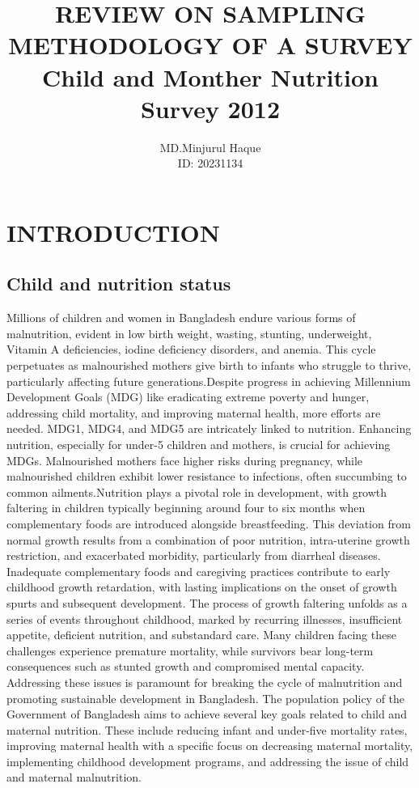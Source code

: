 \documentclass{report}
\title{REVIEW ON SAMPLING METHODOLOGY OF A SURVEY\\Child and Monther Nutrition Survey 2012}
\author{MD.Minjurul Haque \\ID: 20231134}
\date{}
\begin{document}
\maketitle
\pagebreak



\chapter{\huge{INTRODUCTION}}
\section{Child and nutrition status}


Millions of children and women in Bangladesh endure various forms of malnutrition, evident in low birth weight, wasting, stunting, underweight, Vitamin A deficiencies, iodine deficiency disorders, and anemia. This cycle perpetuates as malnourished mothers give birth to infants who struggle to thrive, particularly affecting future generations.Despite progress in achieving Millennium Development Goals (MDG) like eradicating extreme poverty and hunger, addressing child mortality, and improving maternal health, more efforts are needed. MDG1, MDG4, and MDG5 are intricately linked to nutrition. Enhancing nutrition, especially for under-5 children and mothers, is crucial for achieving MDGs. 
Malnourished mothers face higher risks during pregnancy, while malnourished children exhibit lower resistance to infections, often succumbing to common ailments.Nutrition plays a pivotal role in development, with growth faltering in children typically beginning around four to six months when complementary foods are introduced alongside breastfeeding. This deviation from normal growth results from a combination of poor nutrition, intra-uterine growth restriction, and exacerbated morbidity, particularly from diarrheal diseases. Inadequate complementary foods and caregiving practices contribute to early childhood growth retardation, with lasting implications on the onset of growth spurts and subsequent development. 
The process of growth faltering unfolds as a series of events throughout childhood, marked by recurring illnesses, insufficient appetite, deficient nutrition, and substandard care. Many children facing these challenges experience premature mortality, while survivors bear long-term consequences such as stunted growth and compromised mental capacity. Addressing these issues is paramount for breaking the cycle of malnutrition and promoting sustainable development in Bangladesh. The population policy of the Government of Bangladesh aims to achieve several key goals related to child and maternal nutrition. These include reducing infant and under-five mortality rates, improving maternal health with a specific focus on decreasing maternal mortality, implementing childhood development programs, and addressing the issue of child and maternal malnutrition.
\end{document}

